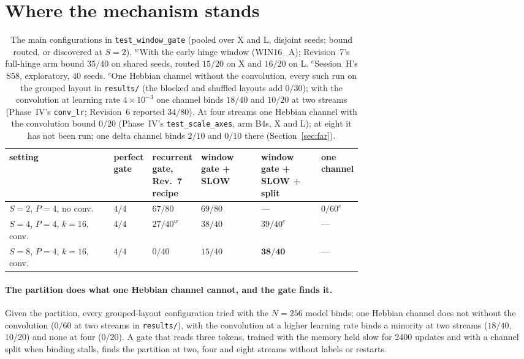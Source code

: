 \documentclass[11pt]{article}
\newcommand{\arm}[1]{\textsf{#1}}
\begin{document}
\section{Where the mechanism stands}
\label{sec:synthesis}

\begin{table}[h]
\centering
\footnotesize
\setlength{\tabcolsep}{4pt}
\begin{tabular}{@{}l>{\centering\arraybackslash}p{0.1\linewidth}>{\centering\arraybackslash}p{0.13\linewidth}>{\centering\arraybackslash}p{0.17\linewidth}>{\centering\arraybackslash}p{0.17\linewidth}>{\centering\arraybackslash}p{0.1\linewidth}@{}}
\toprule
setting & perfect gate & recurrent gate, Rev.~7 recipe & window gate + SLOW & window gate + SLOW + split & one channel\\
\midrule
$S{=}2$, $P{=}4$, no conv. & $4/4$ & $67/80$ & $69/80$ & --- & $0/60^{c}$\\
$S{=}4$, $P{=}4$, $k{=}16$, conv. & $4/4$ & $27/40^{w}$ & $38/40$ & $39/40^{e}$ & ---\\
$S{=}8$, $P{=}4$, $k{=}16$, conv. & $4/4$ & $0/40$ & $15/40$ & $\mathbf{38/40}$ & ---\\
\bottomrule
\end{tabular}
\caption{The main configurations in \texttt{test\_window\_gate} (pooled over X and L, disjoint seeds; bound routed, or discovered at $S = 2$). $^{w}$With the early hinge window (\arm{WIN16\_A}); Revision~7's full-hinge arm bound $35/40$ on shared seeds, routed $15/20$ on X and $16/20$ on L. $^{e}$Session~H's S58, exploratory, 40 seeds. $^{c}$One Hebbian channel without the convolution, every such run on the grouped layout in \texttt{results/} (the blocked and shuffled layouts add $0/30$); with the convolution at learning rate $4\times10^{-3}$ one channel binds $18/40$ and $10/20$ at two streams (Phase~IV's \texttt{conv\_lr}; Revision~6 reported $34/80$). At four streams one Hebbian channel with the convolution bound $0/20$ (Phase~IV's \texttt{test\_scale\_axes}, arm B4s, X and L); at eight it has not been run; one delta channel binds $2/10$ and $0/10$ there (Section~\ref{sec:far}).}
\label{tab:synthesis}
\end{table}

\paragraph{The partition does what one Hebbian channel cannot, and the gate finds it.} Given the partition, every grouped-layout configuration tried with the $N = 256$ model binds; one Hebbian channel does not without the convolution ($0/60$ at two streams in \texttt{results/}), with the convolution at a higher learning rate binds a minority at two streams ($18/40$, $10/20$) and none at four ($0/20$). A gate that reads three tokens, trained with the memory held slow for 2400 updates and with a channel split when binding stalls, finds the partition at two, four and eight streams without labels or restarts.
\end{document}
